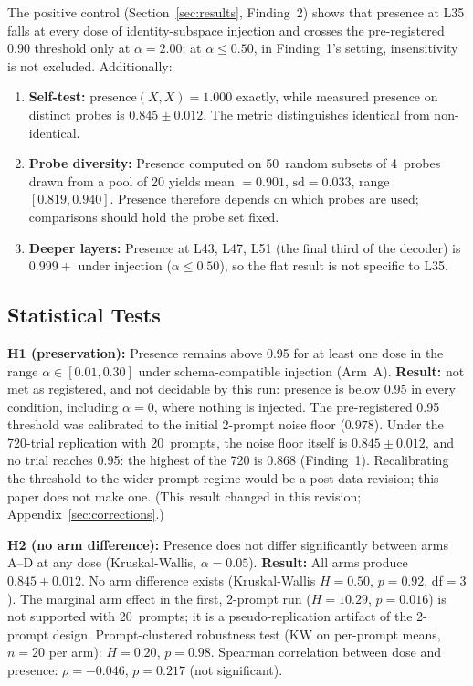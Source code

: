 \documentclass[11pt,a4paper]{article}
\begin{document}
The positive control (Section~\ref{sec:results}, Finding~2)
shows that presence at L35 falls at every dose of identity-subspace
injection and crosses the pre-registered $0.90$ threshold only at
$\alpha = 2.00$; at $\alpha \le 0.50$, in Finding~1's setting,
insensitivity is not excluded. Additionally:

\begin{enumerate}[nosep]
  \item \textbf{Self-test:} $\text{presence}(X, X) = 1.000$ exactly, while
    measured presence on distinct probes is $0.845 \pm 0.012$. The metric
    distinguishes identical from non-identical.
  \item \textbf{Probe diversity:} Presence computed on 50~random subsets of
    4~probes drawn from a pool of 20 yields mean $= 0.901$, $\text{sd}{=}0.033$,
    range $[0.819, 0.940]$. Presence therefore depends on which probes
    are used; comparisons should hold the probe set fixed.
  \item \textbf{Deeper layers:} Presence at L43, L47, L51 (the final third
    of the decoder) is $0.999{+}$ under injection ($\alpha \le 0.50$), so
    the flat result is not specific to L35.
\end{enumerate}

\subsection{Statistical Tests}

\textbf{H1 (preservation):} Presence remains above 0.95 for at least one
dose in the range $\alpha \in [0.01, 0.30]$ under schema-compatible
injection (Arm~A). \textbf{Result:} not met as registered, and not
decidable by this run: presence is below 0.95 in every condition,
including $\alpha = 0$, where nothing is injected. The pre-registered
0.95 threshold was calibrated to the initial 2-prompt noise floor
($0.978$). Under the 720-trial replication with 20~prompts,
the noise floor itself is $0.845 \pm 0.012$, and no trial reaches 0.95:
the highest of the 720 is $0.868$ (Finding~1). Recalibrating the threshold to the wider-prompt regime would be a
post-data revision; this paper does not make one. (This result changed
in this revision; Appendix~\ref{sec:corrections}.)

\textbf{H2 (no arm difference):} Presence does not differ significantly
between arms A--D at any dose (Kruskal-Wallis, $\alpha = 0.05$).
\textbf{Result:} All arms produce $0.845 \pm 0.012$. No arm difference
exists (Kruskal-Wallis $H{=}0.50$, $p{=}0.92$, df$=3$). The marginal
arm effect in the first, 2-prompt run ($H{=}10.29$, $p{=}0.016$) is not
supported with 20~prompts; it is a pseudo-replication artifact of the
2-prompt design. Prompt-clustered robustness test (KW on per-prompt means,
$n{=}20$ per arm): $H{=}0.20$, $p{=}0.98$. Spearman correlation between
dose and presence: $\rho{=}{-}0.046$, $p{=}0.217$ (not significant).
\end{document}
